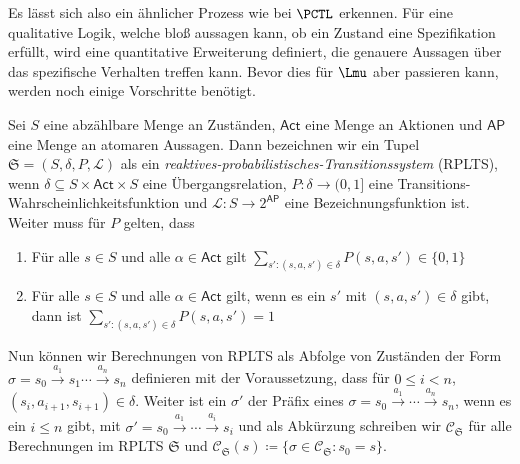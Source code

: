 Es lässt sich also ein ähnlicher Prozess wie bei $\PCTL$ erkennen.
Für eine qualitative Logik, welche bloß aussagen kann, ob ein Zustand eine Spezifikation erfüllt, wird eine quantitative Erweiterung definiert, die genauere Aussagen über das spezifische Verhalten treffen kann.
Bevor dies für $\Lmu$ aber passieren kann, werden noch einige Vorschritte benötigt.
\begin{definition}
	Sei $S$ eine abzählbare Menge an Zuständen, $\mathsf{Act}$ eine Menge an Aktionen und $\mathsf{AP}$ eine Menge an atomaren Aussagen.
	Dann bezeichnen wir ein Tupel $\mathfrak{S}=(S,\delta,P,\mathcal{L})$ als ein \textit{reaktives-probabilistisches-Transitionssystem} (RPLTS), wenn $\delta\subseteq S\times \mathsf{Act} \times S$ eine Übergangsrelation, $P:\delta\to (0,1]$ eine Transitions-Wahrscheinlichkeitsfunktion und $\mathcal{L}:S\to2^{\mathsf{AP}}$ eine Bezeichnungsfunktion ist.
	Weiter muss für $P$ gelten, dass
	\begin{enumerate}
		\item Für alle $s\in S$ und alle $\alpha\in \mathsf{Act}$ gilt $\sum_{s' : (s,a,s')\in \delta} P(s,a,s')\in \{0,1\}$
		\item Für alle $s\in S$ und alle $\alpha\in \mathsf{Act}$ gilt, wenn es ein $s'$ mit $(s,a,s')\in \delta$ gibt, dann ist $\sum_{s' : (s,a,s')\in \delta} P(s,a,s') = 1$ \cite{cleaveland2005probabilistic}
	\end{enumerate}
\end{definition}

Nun können wir Berechnungen von RPLTS als Abfolge von Zuständen der Form $\sigma = s_0\xrightarrow{a_1}s_1 \cdots \xrightarrow{a_n}s_n$ definieren mit der Voraussetzung, dass für $0\leq i <n$, $(s_i,a_{i+1},s_{i+1})\in \delta$.
Weiter ist ein $\sigma'$ der Präfix eines $\sigma=s_0\xrightarrow{a_1} \cdots \xrightarrow{a_n}s_n$, wenn es ein $i\leq n$ gibt, mit $\sigma' = s_0\xrightarrow{a_1}\cdots \xrightarrow{a_i}s_i$ und als Abkürzung schreiben wir $\mathcal{C}_\mathfrak{S}$ für alle Berechnungen im RPLTS $\mathfrak{S}$ und $\mathcal{C}_\mathfrak{S}(s)\coloneqq \{\sigma\in \mathcal{C}_\mathfrak{S} : s_0=s\}$. \cite{cleaveland2005probabilistic}

